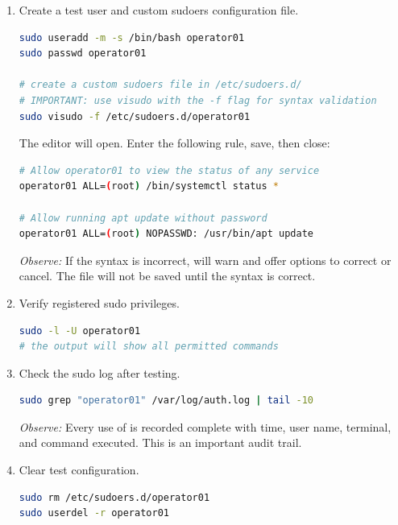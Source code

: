 \begin{enumerate}
\item Create a test user and custom sudoers configuration file.
\begin{lstlisting}[language=bash, caption={User setup and sudo configuration}]
sudo useradd -m -s /bin/bash operator01
sudo passwd operator01

# create a custom sudoers file in /etc/sudoers.d/
# IMPORTANT: use visudo with the -f flag for syntax validation
sudo visudo -f /etc/sudoers.d/operator01
\end{lstlisting}

The editor will open. Enter the following rule, save, then close:

\begin{lstlisting}[language=bash, caption={Fill in the sudo configuration for operator01}]
# Allow operator01 to view the status of any service
operator01 ALL=(root) /bin/systemctl status *

# Allow running apt update without password
operator01 ALL=(root) NOPASSWD: /usr/bin/apt update
\end{lstlisting}

\textit{Observe:} If the syntax is incorrect,  will warn and offer options to correct or cancel. The file will not be saved until the syntax is correct.

\item Verify registered sudo privileges.
\begin{lstlisting}[language=bash, caption={Verify sudo rules}]
sudo -l -U operator01
# the output will show all permitted commands
\end{lstlisting}

\item Check the sudo log after testing.
\begin{lstlisting}[language=bash, caption={Check the sudo activity log}]
sudo grep "operator01" /var/log/auth.log | tail -10
\end{lstlisting}

\textit{Observe:} Every use of  is recorded complete with time, user name, terminal, and command executed. This is an important audit trail.

\item Clear test configuration.
\begin{lstlisting}[language=bash, caption={Delete test configuration}]
sudo rm /etc/sudoers.d/operator01
sudo userdel -r operator01
\end{lstlisting}
\end{enumerate}


